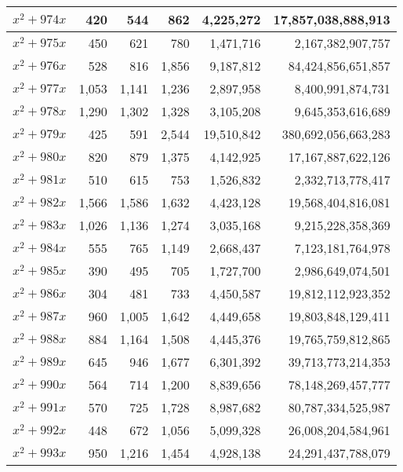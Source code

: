 \documentclass[a4paper]{amsproc}
\theoremstyle{plain}
\begin{document}
\begin{longtable}{ | l | r | r | r | r | r | }
$x^2 + 974x$ & 420 & 544 & 862 & 4{,}225{,}272 & 17{,}857{,}038{,}888{,}913 \\ \hline
$x^2 + 975x$ & 450 & 621 & 780 & 1{,}471{,}716 & 2{,}167{,}382{,}907{,}757 \\ \hline
$x^2 + 976x$ & 528 & 816 & 1{,}856 & 9{,}187{,}812 & 84{,}424{,}856{,}651{,}857 \\ \hline
$x^2 + 977x$ & 1{,}053 & 1{,}141 & 1{,}236 & 2{,}897{,}958 & 8{,}400{,}991{,}874{,}731 \\ \hline
$x^2 + 978x$ & 1{,}290 & 1{,}302 & 1{,}328 & 3{,}105{,}208 & 9{,}645{,}353{,}616{,}689 \\ \hline
$x^2 + 979x$ & 425 & 591 & 2{,}544 & 19{,}510{,}842 & 380{,}692{,}056{,}663{,}283 \\ \hline
$x^2 + 980x$ & 820 & 879 & 1{,}375 & 4{,}142{,}925 & 17{,}167{,}887{,}622{,}126 \\ \hline
$x^2 + 981x$ & 510 & 615 & 753 & 1{,}526{,}832 & 2{,}332{,}713{,}778{,}417 \\ \hline
$x^2 + 982x$ & 1{,}566 & 1{,}586 & 1{,}632 & 4{,}423{,}128 & 19{,}568{,}404{,}816{,}081 \\ \hline
$x^2 + 983x$ & 1{,}026 & 1{,}136 & 1{,}274 & 3{,}035{,}168 & 9{,}215{,}228{,}358{,}369 \\ \hline
$x^2 + 984x$ & 555 & 765 & 1{,}149 & 2{,}668{,}437 & 7{,}123{,}181{,}764{,}978 \\ \hline
$x^2 + 985x$ & 390 & 495 & 705 & 1{,}727{,}700 & 2{,}986{,}649{,}074{,}501 \\ \hline
$x^2 + 986x$ & 304 & 481 & 733 & 4{,}450{,}587 & 19{,}812{,}112{,}923{,}352 \\ \hline
$x^2 + 987x$ & 960 & 1{,}005 & 1{,}642 & 4{,}449{,}658 & 19{,}803{,}848{,}129{,}411 \\ \hline
$x^2 + 988x$ & 884 & 1{,}164 & 1{,}508 & 4{,}445{,}376 & 19{,}765{,}759{,}812{,}865 \\ \hline
$x^2 + 989x$ & 645 & 946 & 1{,}677 & 6{,}301{,}392 & 39{,}713{,}773{,}214{,}353 \\ \hline
$x^2 + 990x$ & 564 & 714 & 1{,}200 & 8{,}839{,}656 & 78{,}148{,}269{,}457{,}777 \\ \hline
$x^2 + 991x$ & 570 & 725 & 1{,}728 & 8{,}987{,}682 & 80{,}787{,}334{,}525{,}987 \\ \hline
$x^2 + 992x$ & 448 & 672 & 1{,}056 & 5{,}099{,}328 & 26{,}008{,}204{,}584{,}961 \\ \hline
$x^2 + 993x$ & 950 & 1{,}216 & 1{,}454 & 4{,}928{,}138 & 24{,}291{,}437{,}788{,}079 \\ \hline

\end{longtable}
\end{document}
